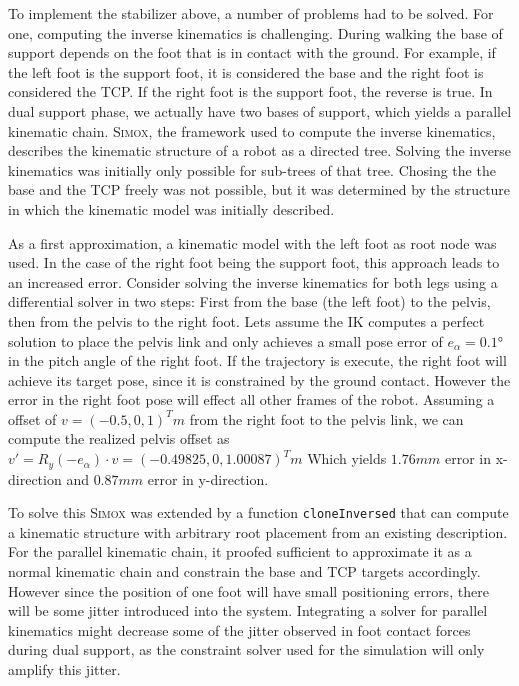 \documentclass[english,ngerman]{KITreprt}
\newcommand{\name}[1]{\textsc{#1}}
\begin{document}
To implement the stabilizer above, a number of problems had to be
solved. For one, computing the inverse kinematics is challenging. During
walking the base of support depends on the foot that is in contact with
the ground. For example, if the left foot is the support foot, it is
considered the base and the right foot is considered the TCP. If the
right foot is the support foot, the reverse is true. In dual support
phase, we actually have two bases of support, which yields a parallel
kinematic chain. \name{Simox}, the framework used to compute the inverse
kinematics, describes the kinematic structure of a robot as a directed
tree. Solving the inverse kinematics was initially only possible for
sub-trees of that tree. Chosing the the base and the TCP freely was not
possible, but it was determined by the structure in which the kinematic
model was initially described.

As a first approximation, a kinematic model with the left foot as root
node was used. In the case of the right foot being the support foot,
this approach leads to an increased error. Consider solving the inverse
kinematics for both legs using a differential solver in two steps: First
from the base (the left foot) to the pelvis, then from the pelvis to the
right foot. Lets assume the IK computes a perfect solution to place the
pelvis link and only achieves a small pose error of $e_{\alpha} = 0.1°$
in the pitch angle of the right foot. If the trajectory is execute, the
right foot will achieve its target pose, since it is constrained by the
ground contact. However the error in the right foot pose will effect all
other frames of the robot. Assuming a offset of $v = (-0.5, 0, 1)^T m$
from the right foot to the pelvis link, we can compute the realized
pelvis offset as
$v' = R_y(-e_{\alpha}) \cdot v = (-0.49825, 0,  1.00087)^T m$ Which
yields $1.76mm$ error in x-direction and $0.87mm$ error in y-direction.

To solve this \name{Simox} was extended by a function
\texttt{cloneInversed} that can compute a kinematic structure with
arbitrary root placement from an existing description. For the parallel
kinematic chain, it proofed sufficient to approximate it as a normal
kinematic chain and constrain the base and TCP targets accordingly.
However since the position of one foot will have small positioning
errors, there will be some jitter introduced into the system.
Integrating a solver for parallel kinematics might decrease some of the
jitter observed in foot contact forces during dual support, as the
constraint solver used for the simulation will only amplify this jitter.
\end{document}
